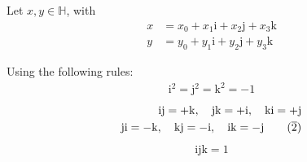 \documentclass[a4paper,10pt]{scrartcl}
\title{}
\author{}
\date{}
\begin{document}
\noindent Let $x, y \in \mathbb{H}$, with
\begin{align*}
 x &= x_0 + x_1 \mathrm{i} + x_2 \mathrm{j} + x_3 \mathrm{k} \\
 y &= y_0 + y_1 \mathrm{i} + y_2 \mathrm{j} + y_3 \mathrm{k}
\end{align*}

\noindent Using the following rules:
\begin{align}
 \mathrm{i}^2 = \mathrm{j}^2 = \mathrm{k}^2 = -1
\end{align}
\begin{align}
 \mathrm{i} \mathrm{j} = +\mathrm{k},\quad \mathrm{j} \mathrm{k} = +\mathrm{i},\quad \mathrm{k} \mathrm{i} = +\mathrm{j} \\
 \mathrm{j} \mathrm{i} = -\mathrm{k},\quad \mathrm{k} \mathrm{j} = -\mathrm{i},\quad \mathrm{i} \mathrm{k} = -\mathrm{j} \tag{$\overline{2}$}
\end{align}
\begin{align}
 \mathrm{ijk} = 1
\end{align}
\end{document}
